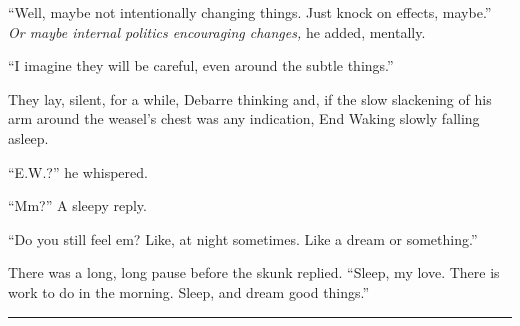 ``Well, maybe not intentionally changing things. Just knock on effects, maybe.'' \emph{Or maybe internal politics encouraging changes,} he added, mentally.

``I imagine they will be careful, even around the subtle things.''

They lay, silent, for a while, Debarre thinking and, if the slow slackening of his arm around the weasel's chest was any indication, End Waking slowly falling asleep.

``E.W.?'' he whispered.

``Mm?'' A sleepy reply.

``Do you still feel em? Like, at night sometimes. Like a dream or something.''

There was a long, long pause before the skunk replied. ``Sleep, my love. There is work to do in the morning. Sleep, and dream good things.''

\begin{center}\rule{0.5\linewidth}{0.5pt}\end{center}
